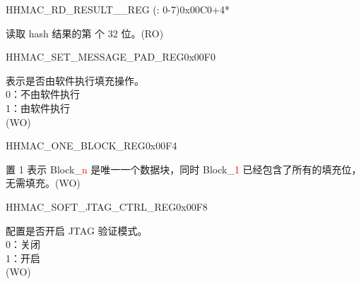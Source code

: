 \begin{register}{H}{HMAC\_RD\_RESULT\_\_REG (: 0-7)}{0x00C0+4*}\label{regdesc:HMACRDRESULTNREG}
%
\regnewline%
\begin{regdesc}\begin{reglist}
\label{fielddesc:HMACRDATAN}\item [HMAC\_RDATA\_\regindex{n}] 读取 hash 结果的第  个 32 位。(RO)
\end{reglist}\end{regdesc}
\end{register}


\begin{register}{H}{HMAC\_SET\_MESSAGE\_PAD\_REG}{0x00F0}\label{regdesc:HMACSETMESSAGEPADREG}
%
%
\regnewline%
\begin{regdesc}\begin{reglist}
\label{fielddesc:HMACSETTEXTPAD}\item [HMAC\_SET\_TEXT\_PAD] 表示是否由软件执行填充操作。
\\0：不由软件执行
\\1：由软件执行
\\(WO)
\end{reglist}\end{regdesc}
\end{register}


\begin{register}{H}{HMAC\_ONE\_BLOCK\_REG}{0x00F4}\label{regdesc:HMACONEBLOCKREG}
%
%
\regnewline%
\begin{regdesc}\begin{reglist}
\label{fielddesc:HMACSETONEBLOCK}\item [HMAC\_SET\_ONE\_BLOCK] 置 1 表示 Block\_\textcolor{red}{n} 是唯一一个数据块，同时 Block\_\textcolor{red}{1} 已经包含了所有的填充位，无需填充。(WO)
\end{reglist}\end{regdesc}
\end{register}


\begin{register}{H}{HMAC\_SOFT\_JTAG\_CTRL\_REG}{0x00F8}\label{regdesc:HMACSOFTJTAGCTRLREG}
%
%
\regnewline%
\begin{regdesc}\begin{reglist}
\label{fielddesc:HMACSOFTJTAGCTRL}\item [HMAC\_SOFT\_JTAG\_CTRL] 配置是否开启 JTAG 验证模式。
\\0：关闭
\\1：开启
\\(WO)
\end{reglist}\end{regdesc}
\end{register}


